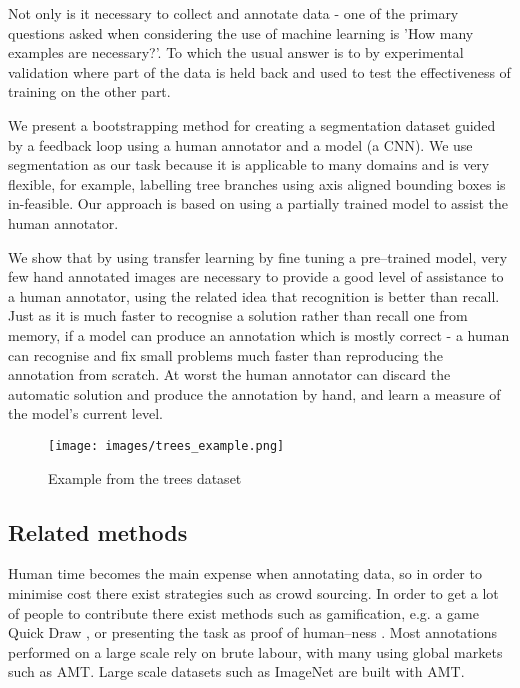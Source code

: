 \documentclass{IEEEtran}
\begin{document}
Not only is it necessary to collect and annotate data - one of the primary questions asked when considering the use of machine learning is 'How many examples are necessary?'. To which the usual answer is to by experimental validation where part of the data is held back and used to test the effectiveness of training on the other part.

We present a bootstrapping method for creating a segmentation dataset guided by a feedback loop using a human annotator and a model (a \gls{CNN}). We use segmentation as our task because it is applicable to many domains and is very flexible, for example, labelling tree branches using axis aligned bounding boxes is in-feasible. Our approach is based on using a partially trained model to assist the human annotator.

We show that by using transfer learning by fine tuning a pre--trained model, very few hand annotated images are necessary to provide a good level of assistance to a human annotator, using the related idea that recognition is better than recall. Just as it is much faster to recognise a solution rather than recall one from memory, if a model can produce an annotation which is mostly correct - a human can recognise and fix small problems much faster than reproducing the annotation from scratch. At worst the human annotator can discard the automatic solution and produce the annotation by hand, and learn a measure of the model's current level.

\begin{figure}[h*]
\centering
\texttt{[image: images/trees\_example.png]}

\caption{Example from the trees dataset}
\label{fig:tree}
\end{figure}

\subsection{Related methods}


Human time becomes the main expense when annotating data, so in order to minimise cost there exist strategies such as crowd sourcing. In order to get a lot of people to contribute there exist methods such as gamification, e.g. a game Quick Draw \cite{Ha2017}, or presenting the task as proof of human--ness \cite{Goodfellow2013a}.  Most annotations performed on a large scale rely on brute labour, with many using global markets such as \gls{AMT}. Large scale datasets such as ImageNet \cite{Russakovsky2015} are built with \gls{AMT}. 
\end{document}
